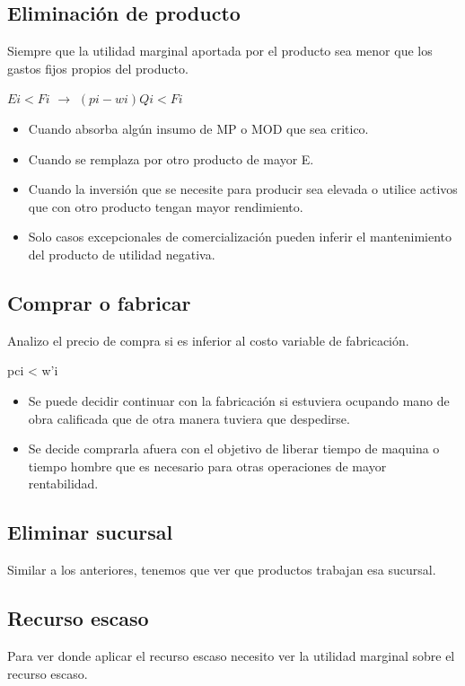 \documentclass[titlepage,a4paper]{article}
\begin{document}
\subsection*{Eliminación de producto}
Siempre que la utilidad marginal aportada por el producto sea menor que los gastos fijos propios del producto.

\medskip
$Ei < Fi$ $\rightarrow$  $(pi - wi) Qi < Fi$


\begin{itemize}
\item Cuando absorba algún insumo de MP o MOD que sea critico.
\item Cuando se remplaza por otro producto de mayor E.
\item Cuando la inversión que se necesite para producir sea elevada o utilice activos que con otro producto tengan mayor rendimiento.
\item Solo casos excepcionales de comercialización pueden inferir el mantenimiento del producto de utilidad negativa.
\end{itemize}

\subsection*{Comprar o fabricar}
Analizo el precio de compra si es inferior al costo variable de fabricación.

\medskip
pci < w'i


\begin{itemize}
\item Se puede decidir continuar con la fabricación si estuviera ocupando mano de obra calificada que de otra manera tuviera que despedirse.
\item Se decide comprarla afuera con el objetivo de liberar tiempo de maquina o tiempo hombre que es necesario para otras operaciones de mayor rentabilidad.
\end{itemize}

\subsection*{Eliminar sucursal}
Similar a los anteriores, tenemos que ver que productos trabajan esa sucursal.


\subsection*{Recurso escaso}
Para ver donde aplicar el recurso escaso necesito ver la utilidad marginal sobre el recurso escaso.
\end{document}
